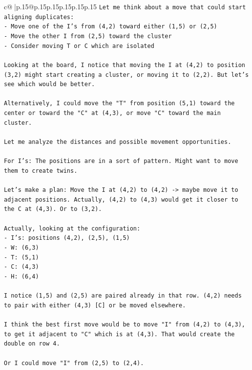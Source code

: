 \documentclass{article}
\begin{document}
{\begin{supertabular}{c@{$\;$}|p{.15\linewidth}@{}p{.15\linewidth}p{.15\linewidth}p{.15\linewidth}p{.15\linewidth}p{.15\linewidth}}
{{{\texttt{Let me think about a move that could start aligning duplicates:} \\
\texttt{{-} Move one of the I's from (4,2) toward either (1,5) or (2,5)} \\
\texttt{{-} Move the other I from (2,5) toward the cluster} \\
\texttt{{-} Consider moving T or C which are isolated} \\
\\ 
\texttt{Looking at the board, I notice that moving the I at (4,2) to position (3,2) might start creating a cluster, or moving it to (2,2). But let's see which would be better.} \\
\\ 
\texttt{Alternatively, I could move the "T" from position (5,1) toward the center or toward the "C" at (4,3), or move "C" toward the main cluster.} \\
\\ 
\texttt{Let me analyze the distances and possible movement opportunities.} \\
\\ 
\texttt{For I's: The positions are in a sort of pattern. Might want to move them to create twins.} \\
\\ 
\texttt{Let's make a plan: Move the I at (4,2) to (4,2) {-}> maybe move it to adjacent positions. Actually, (4,2) to (4,3) would get it closer to the C at (4,3). Or to (3,2).} \\
\\ 
\texttt{Actually, looking at the configuration:} \\
\texttt{{-} I's: positions (4,2), (2,5), (1,5)} \\
\texttt{{-} W: (6,3)} \\
\texttt{{-} T: (5,1)} \\
\texttt{{-} C: (4,3)} \\
\texttt{{-} H: (6,4)} \\
\\ 
\texttt{I notice (1,5) and (2,5) are paired already in that row. (4,2) needs to pair with either (4,3) {[}C{]} or be moved elsewhere.} \\
\\ 
\texttt{I think the best first move would be to move "I" from (4,2) to (4,3), to get it adjacent to "C" which is at (4,3). That would create the double on row 4.} \\
\\ 
\texttt{Or I could move "I" from (2,5) to (2,4).} \\
}}}
\end{supertabular}}
\end{document}
